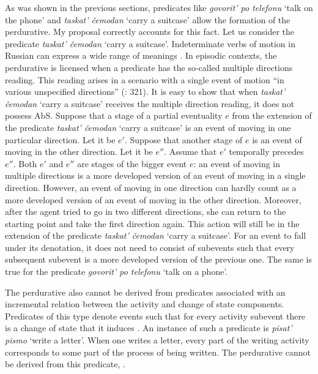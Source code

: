 \documentclass[output=paper,
]{langscibook}
\begin{document}
As was shown in the previous sections, predicates like \textit{govorit’ po telefonu} `talk on the phone' and \textit{taskat’ čemodan} `carry a suitcase' allow the formation of the perdurative. My proposal correctly accounts for this fact. Let us consider the predicate \textit{taskat’ čemodan} `carry a suitcase'. Indeterminate verbs of motion in Russian can express a wide range of meanings \citep{forsyth1970grammar}. In episodic contexts, the perdurative is licensed when a predicate has the so-called multiple directions reading. This reading arises in a scenario with a single event of motion ``in various unspecified directions'' (\citealt{forsyth1970grammar}: 321). It is easy to show that when \textit{taskat’ čemodan} `carry a suitcase' receives the multiple direction reading, it does not possess AbS. Suppose that a stage of a partial eventuality $e$ from the extension of the predicate \textit{taskat’ čemodan} `carry a suitcase' is an event of moving in one particular direction. Let it be $e'$. Suppose that another stage of $e$ is an event of moving in the other direction. Let it be $e''$. Assume that $e'$ temporally precedes $e''$. Both $e'$ and $e''$ are stages of the bigger event $e$: an event of moving in multiple directions is a more developed version of an event of moving in a single direction. However, an event of moving in one direction can hardly count as a more developed version of an event of moving in the other direction. Moreover, after the agent tried to go in two different directions, she can return to the starting point and take the first direction again. This action will still be in the extension of the predicate \textit{taskat’ čemodan} `carry a suitcase'. For an event to fall under its denotation, it does not need to consist of subevents such that every subsequent subevent is a more developed version of the previous one. The same is true for the predicate \textit{govorit’ po telefonu} `talk on a phone'. 

The perdurative also cannot be derived from predicates associated with an incremental relation between the activity and change of state components. Predicates of this type denote events such that for every activity subevent there is a change of state that it induces \citep{rothstein2004structuring}. An instance of such a predicate is \textit{pisat’ pismo} `write a letter'. When one writes a letter, every part of the writing activity corresponds to some part of the process of being written. The perdurative cannot be derived from this predicate, .
\end{document}
